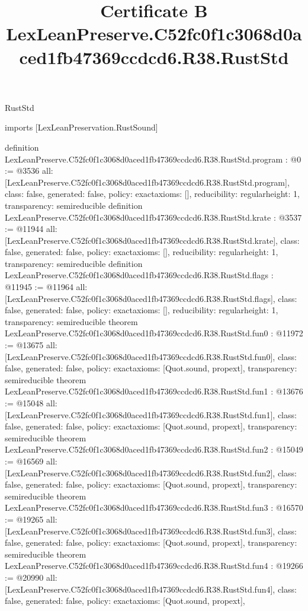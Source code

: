 \begin{lexlean}{RustStd}
\title{Certificate B LexLeanPreserve.C52fc0f1c3068d0aced1fb47369ccdcd6.R38.RustStd}
\begin{coremodule}
imports [LexLeanPreservation.RustSound]

definition LexLeanPreserve.C52fc0f1c3068d0aced1fb47369ccdcd6.R38.RustStd.program : @0 := @3536 {
  all: [LexLeanPreserve.C52fc0f1c3068d0aced1fb47369ccdcd6.R38.RustStd.program],
  class: false,
  generated: false,
  policy: exact{axioms: []},
  reducibility: regular{height: 1},
  transparency: semireducible
}
definition LexLeanPreserve.C52fc0f1c3068d0aced1fb47369ccdcd6.R38.RustStd.krate : @3537 := @11944 {
  all: [LexLeanPreserve.C52fc0f1c3068d0aced1fb47369ccdcd6.R38.RustStd.krate],
  class: false,
  generated: false,
  policy: exact{axioms: []},
  reducibility: regular{height: 1},
  transparency: semireducible
}
definition LexLeanPreserve.C52fc0f1c3068d0aced1fb47369ccdcd6.R38.RustStd.flags : @11945 := @11964 {
  all: [LexLeanPreserve.C52fc0f1c3068d0aced1fb47369ccdcd6.R38.RustStd.flags],
  class: false,
  generated: false,
  policy: exact{axioms: []},
  reducibility: regular{height: 1},
  transparency: semireducible
}
theorem LexLeanPreserve.C52fc0f1c3068d0aced1fb47369ccdcd6.R38.RustStd.fun0 : @11972 := @13675 {
  all: [LexLeanPreserve.C52fc0f1c3068d0aced1fb47369ccdcd6.R38.RustStd.fun0],
  class: false,
  generated: false,
  policy: exact{axioms: [Quot.sound, propext]},
  transparency: semireducible
}
theorem LexLeanPreserve.C52fc0f1c3068d0aced1fb47369ccdcd6.R38.RustStd.fun1 : @13676 := @15048 {
  all: [LexLeanPreserve.C52fc0f1c3068d0aced1fb47369ccdcd6.R38.RustStd.fun1],
  class: false,
  generated: false,
  policy: exact{axioms: [Quot.sound, propext]},
  transparency: semireducible
}
theorem LexLeanPreserve.C52fc0f1c3068d0aced1fb47369ccdcd6.R38.RustStd.fun2 : @15049 := @16569 {
  all: [LexLeanPreserve.C52fc0f1c3068d0aced1fb47369ccdcd6.R38.RustStd.fun2],
  class: false,
  generated: false,
  policy: exact{axioms: [Quot.sound, propext]},
  transparency: semireducible
}
theorem LexLeanPreserve.C52fc0f1c3068d0aced1fb47369ccdcd6.R38.RustStd.fun3 : @16570 := @19265 {
  all: [LexLeanPreserve.C52fc0f1c3068d0aced1fb47369ccdcd6.R38.RustStd.fun3],
  class: false,
  generated: false,
  policy: exact{axioms: [Quot.sound, propext]},
  transparency: semireducible
}
theorem LexLeanPreserve.C52fc0f1c3068d0aced1fb47369ccdcd6.R38.RustStd.fun4 : @19266 := @20990 {
  all: [LexLeanPreserve.C52fc0f1c3068d0aced1fb47369ccdcd6.R38.RustStd.fun4],
  class: false,
  generated: false,
  policy: exact{axioms: [Quot.sound, propext]},
}
\end{coremodule}
\end{lexlean}
